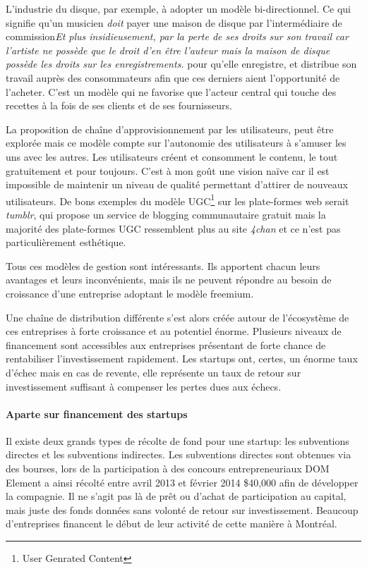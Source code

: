 \documentclass[11pt, a4paper ]{article}
\begin{document}
\begin{spacing}{1.5}
L'industrie du disque, par exemple, à adopter un modèle bi-directionnel. Ce qui signifie qu'un musicien \emph{doit} payer une maison de disque par l’intermédiaire de commission\emph{Et plus insidieusement, par la perte de ses droits sur son travail car l'artiste ne possède que le droit d'en être l'auteur mais la maison de disque possède les droits sur les enregistrements.} pour qu'elle enregistre, et distribue son travail auprès des consommateurs afin que ces derniers aient l'opportunité de l'acheter. C'est un modèle qui ne favorise que l'acteur central qui touche des recettes à la fois de ses clients et de ses fournisseurs.

La proposition de chaîne d'approvisionnement par les utilisateurs, peut être explorée mais ce modèle compte sur l'autonomie des utilisateurs à s'amuser les uns avec les autres. Les utilisateurs créent et consomment le contenu, le tout gratuitement et pour toujours. C'est à mon goût une vision naïve car il est impossible de maintenir un niveau de qualité permettant d'attirer de nouveaux utilisateurs. De bons exemples du modèle UGC\footnote{User Genrated Content} sur les plate-formes web serait \emph{tumblr}, qui propose un service de blogging communautaire gratuit mais la majorité des plate-formes UGC ressemblent plus au site \emph{4chan} et ce n'est pas particulièrement esthétique.

Tous ces modèles de gestion sont intéressants. Ils apportent chacun leurs avantages et leurs inconvénients, mais ils ne peuvent répondre au besoin de croissance d'une entreprise adoptant le modèle freemium.

Une chaîne de distribution différente s'est alors créée autour de l’écosystème de ces entreprises à forte croissance et au potentiel énorme. Plusieurs niveaux de financement sont accessibles aux entreprises présentant de forte chance de rentabiliser l'investissement rapidement. Les startups ont, certes, un énorme taux d’échec mais en cas de revente, elle représente un taux de retour sur investissement suffisant à compenser les pertes dues aux échecs.

		\paragraph{Aparte sur financement des startups}

Il existe deux grands types de récolte de fond pour une startup: les subventions directes et les subventions indirectes.
Les subventions directes sont obtenues via des bourses, lors de la participation à des concours entrepreneuriaux DOM Element a ainsi récolté entre avril 2013 et février 2014 \$40,000 afin de développer la compagnie. Il ne s'agit pas là de prêt ou d'achat de participation au capital, mais juste des fonds données sans volonté de retour sur investissement. Beaucoup d'entreprises financent le début de leur activité de cette manière à Montréal.


\end{spacing}
\end{document}
